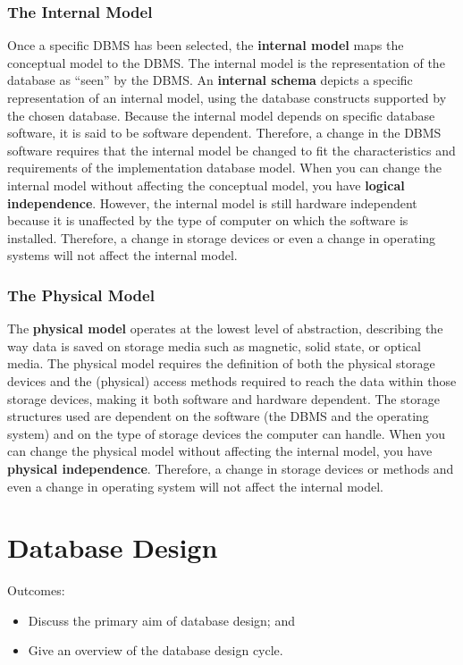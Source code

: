 \documentclass[a4paper, 12pt, titlepage]{report}
\begin{document}
\subsection{The Internal Model}
Once a specific DBMS has been selected, the \textbf{internal model} maps the conceptual model to the DBMS. The internal model is the representation of the database as “seen” by the DBMS. An \textbf{internal schema} depicts a specific representation of an internal model, using the database constructs supported by the chosen database. Because the internal model depends on specific database software, it is said to be software dependent. Therefore, a change in the DBMS software requires that the internal model be changed to fit the characteristics and requirements of the implementation database model. When you can change the internal model without affecting the conceptual model, you have \textbf{logical independence}. However, the internal model is still hardware independent because it is unaffected by the type of computer on which the software is installed. Therefore, a change in storage devices or even a change in operating systems will not affect the internal model.
\subsection{The Physical Model}
The \textbf{physical model} operates at the lowest level of abstraction, describing the way data is saved on storage media such as magnetic, solid state, or optical media. The physical model requires the definition of both the physical storage devices and the (physical) access methods required to reach the data within those storage devices, making it both software and hardware dependent. The storage structures used are dependent on the software (the DBMS and the operating system) and on the type of storage devices the computer can handle. When you can change the physical model without affecting the internal model, you have \textbf{physical independence}. Therefore, a change in storage devices or methods and even a change in operating system will not affect the internal model.

\chapter{Database Design}
Outcomes:
\begin{itemize}
\item Discuss the primary aim of database design; and
\item Give an overview of the database design cycle.
\end{itemize}
\end{document}
